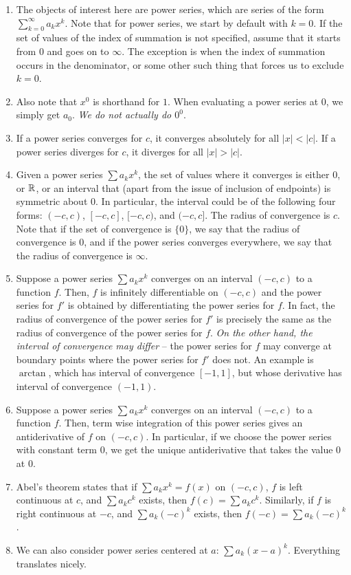 \documentclass[10pt]{amsart}
\begin{document}
\begin{enumerate}
\item The objects of interest here are power series, which are series
  of the form $\sum_{k=0}^\infty a_kx^k$. Note that for power series,
  we start by default with $k = 0$. If the set of values of the index
  of summation is not specified, assume that it starts from $0$ and
  goes on to $\infty$. The exception is when the index of summation
  occurs in the denominator, or some other such thing that forces us
  to exclude $k = 0$.
\item Also note that $x^0$ is shorthand for $1$. When
  evaluating a power series at $0$, we simply get $a_0$. {\em We do
  not actually do $0^0$}.
\item If a power series converges for $c$, it converges absolutely for
  all $|x| < |c|$. If a power series diverges for $c$, it diverges for
  all $|x| > |c|$.
\item Given a power series $\sum a_kx^k$, the set of values where it
  converges is either $0$, or $\mathbb{R}$, or an interval that (apart from
  the issue of inclusion of endpoints) is symmetric about $0$. In
  particular, the interval could be of the following four forms:
  $(-c,c)$, $[-c,c]$, $[-c,c)$, and $(-c,c]$. The radius of
  convergence is $c$. Note that if the set of convergence is $\{ 0
  \}$, we say that the radius of convergence is $0$, and if the power
  series converges everywhere, we say that the radius of convergence
  is $\infty$.
\item Suppose a power series $\sum a_kx^k$ converges on an interval
  $(-c,c)$ to a function $f$. Then, $f$ is infinitely differentiable
  on $(-c,c)$ and the power series for $f'$ is obtained by
  differentiating the power series for $f$. In fact, the radius of
  convergence of the power series for $f'$ is precisely the same as
  the radius of convergence of the power series for $f$. {\em On the
  other hand, the interval of convergence may differ} -- the power
  series for $f$ may converge at boundary points where the power
  series for $f'$ does not. An example is $\arctan$, which has
  interval of convergence $[-1,1]$, but whose derivative has interval
  of convergence $(-1,1)$.
\item Suppose a power series $\sum a_kx^k$ converges on an interval
  $(-c,c)$ to a function $f$. Then, term wise integration of this
  power series gives an antiderivative of $f$ on $(-c,c)$. In
  particular, if we choose the power series with constant term $0$, we
  get the unique antiderivative that takes the value $0$ at $0$.
\item Abel's theorem states that if $\sum a_kx^k = f(x)$ on $(-c,c)$,
  $f$ is left continuous at $c$, and $\sum a_kc^k$ exists, then $f(c)
  = \sum a_kc^k$. Similarly, if $f$ is right continuous at $-c$, and
  $\sum a_k(-c)^k$ exists, then $f(-c) = \sum a_k(-c)^k$.
\item We can also consider power series centered at $a$: $\sum a_k (x
  - a)^k$. Everything translates nicely.
\end{enumerate}
\end{document}
